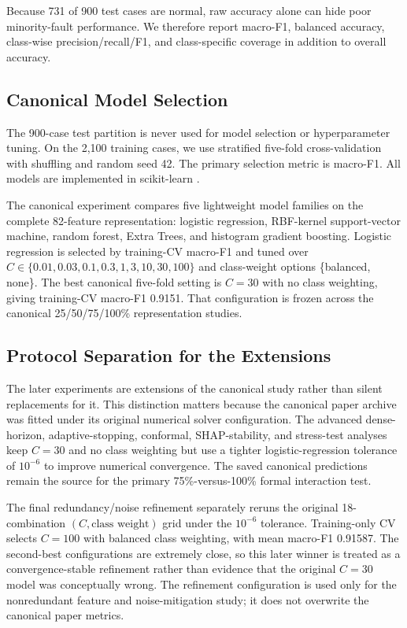 \documentclass[conference]{IEEEtran}
\begin{document}
Because 731 of 900 test cases are normal, raw accuracy alone can hide poor minority-fault performance. We therefore report macro-F1, balanced accuracy, class-wise precision/recall/F1, and class-specific coverage in addition to overall accuracy.

\subsection{Canonical Model Selection}
The 900-case test partition is never used for model selection or hyperparameter tuning. On the 2,100 training cases, we use stratified five-fold cross-validation with shuffling and random seed 42. The primary selection metric is macro-F1. All models are implemented in scikit-learn \cite{pedregosa2011}.

The canonical experiment compares five lightweight model families on the complete 82-feature representation: logistic regression, RBF-kernel support-vector machine, random forest, Extra Trees, and histogram gradient boosting. Logistic regression is selected by training-CV macro-F1 and tuned over $C\in\{0.01,0.03,0.1,0.3,1,3,10,30,100\}$ and class-weight options \{balanced, none\}. The best canonical five-fold setting is $C=30$ with no class weighting, giving training-CV macro-F1 0.9151. That configuration is frozen across the canonical 25/50/75/100\% representation studies.

\subsection{Protocol Separation for the Extensions}
The later experiments are extensions of the canonical study rather than silent replacements for it. This distinction matters because the canonical paper archive was fitted under its original numerical solver configuration. The advanced dense-horizon, adaptive-stopping, conformal, SHAP-stability, and stress-test analyses keep $C=30$ and no class weighting but use a tighter logistic-regression tolerance of $10^{-6}$ to improve numerical convergence. The saved canonical predictions remain the source for the primary 75\%-versus-100\% formal interaction test.

The final redundancy/noise refinement separately reruns the original 18-combination $(C,\text{class weight})$ grid under the $10^{-6}$ tolerance. Training-only CV selects $C=100$ with balanced class weighting, with mean macro-F1 0.91587. The second-best configurations are extremely close, so this later winner is treated as a convergence-stable refinement rather than evidence that the original $C=30$ model was conceptually wrong. The refinement configuration is used only for the nonredundant feature and noise-mitigation study; it does not overwrite the canonical paper metrics.
\end{document}
